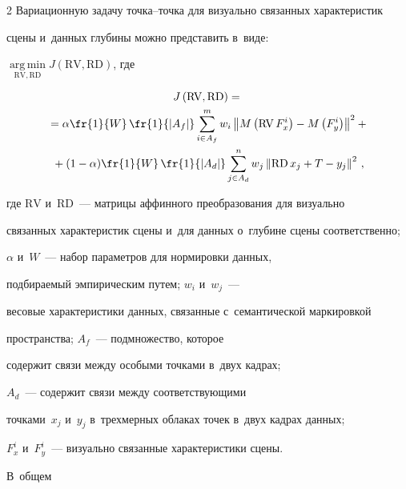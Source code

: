 \begin{multicols}{2}
  Вариационную задачу точ\-ка--точ\-ка для визуально связанных характеристик 

сцены и~данных глубины мож\-но представить в~виде:

  $\mathop{\mathrm{arg\,min}}\limits_{  \mathrm{RV}, \mathrm{RD}}

  J\left(\mathrm{RV}, \mathrm{RD}\right)$, где 

  

  \noindent

  \begin{multline*}

  J\left(\mathrm{RV}, \mathrm{RD}\right)={}\\

  {}= \alpha \fr{1}{{W}} \,\fr{1}{\vert 

{A}_{{f}} \vert} \sum\limits^m_{i\in A_f} {w}_i\left\|

  M\left( \mathrm{RV}\,F_x^i\right) -M\left( F_y^i\right)\right\|^2+{}\\

  {}+(1-\alpha) \fr{1}{{W}}\,

  \fr{1}{\vert {A}_{{d}}\vert } \sum\limits^n_{j\in A_d} {w}_j\left\| 

\mathrm{RD}\,x_j +T-y_j\right\|^2\,,


  \end{multline*}

где $\mathrm{RV}$ и~$\mathrm{RD}$~--- мат\-ри\-цы аффинного преобразования для визуально 

связанных характеристик сцены и~для данных о~глубине сцены соответственно; 

$\alpha$ и~${W}$~--- набор параметров для нормировки данных, 

подбираемый эмпирическим путем; ${w}_i$ и~${w}_j$~--- 

весовые характеристики данных, связанные с~семантической маркировкой 

про\-стран\-ст\-ва; ${A}_{{f}}$~--- подмножество, которое 

содержит связи между особыми точками в~двух кадрах; 

${A}_{{d}}$~--- содержит связи между соответствующими 

точками~$x_j$ и~$y_j$ в~трехмерных облаках точек в~двух кадрах данных; 

$F_x^i$ и~$F_y^i$~--- визуально связанные характеристики сцены. 



В~общем 


\end{multicols}
